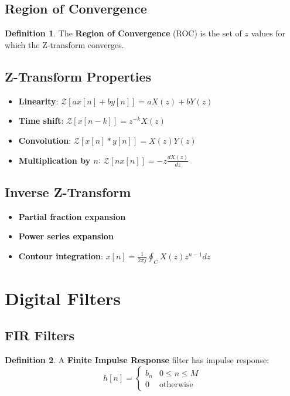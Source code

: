 \documentclass[11pt]{article}
\theoremstyle{definition}
\newtheorem{definition}{Definition}[section]
\begin{document}
\subsection{Region of Convergence}
\begin{definition}
The \textbf{Region of Convergence} (ROC) is the set of $z$ values for which the Z-transform converges.
\end{definition}

\subsection{Z-Transform Properties}
\begin{itemize}
    \item \textbf{Linearity}: $\mathcal{Z}[ax[n] + by[n]] = aX(z) + bY(z)$
    \item \textbf{Time shift}: $\mathcal{Z}[x[n-k]] = z^{-k}X(z)$
    \item \textbf{Convolution}: $\mathcal{Z}[x[n] * y[n]] = X(z)Y(z)$
    \item \textbf{Multiplication by $n$}: $\mathcal{Z}[nx[n]] = -z \frac{dX(z)}{dz}$
\end{itemize}

\subsection{Inverse Z-Transform}
\begin{itemize}
    \item \textbf{Partial fraction expansion}
    \item \textbf{Power series expansion}
    \item \textbf{Contour integration}: $x[n] = \frac{1}{2\pi j} \oint_C X(z) z^{n-1} dz$
\end{itemize}

\section{Digital Filters}

\subsection{FIR Filters}
\begin{definition}
A \textbf{Finite Impulse Response} filter has impulse response:
$$h[n] = \begin{cases} b_n & 0 \leq n \leq M \\ 0 & \text{otherwise} \end{cases}$$
\end{definition}
\end{document}

